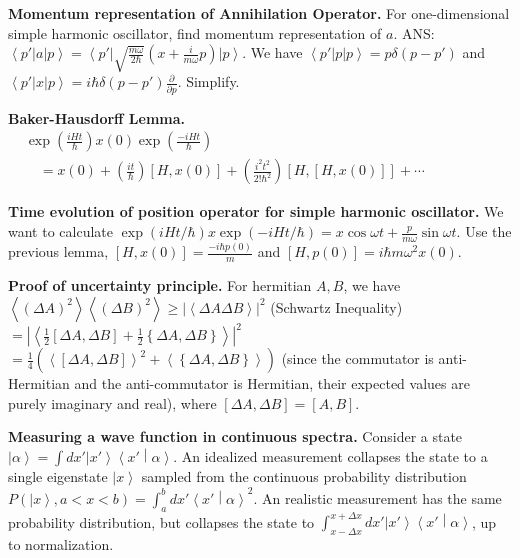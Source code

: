 \textbf{Momentum representation of Annihilation Operator.} For one-dimensional simple harmonic oscillator, find momentum representation of $a$. ANS: $\left\langle p' \right| a \left| p \right\rangle  = \left\langle p' \right| \sqrt{\frac{m \omega}{2 \hbar}} (x + \frac{i}{m \omega} p) \left| p \right\rangle$. We have $\left\langle p' \right| p \left| p \right\rangle  = p \delta(p - p')$ and $\left\langle p' \right| x \left| p \right\rangle = i \hbar \delta(p - p') \frac{\partial }{\partial p} $. Simplify.

\textbf{Baker-Hausdorff Lemma.} $\begin{aligned} & \exp \left(\frac{i H t}{\hbar}\right) x(0) \exp \left(\frac{-i H t}{\hbar}\right) \\ & \quad=x(0)+\left(\frac{i t}{\hbar}\right)[H, x(0)]+\left(\frac{i^2 t^2}{2 ! \hbar^2}\right)[H,[H, x(0)]]+\cdots\end{aligned}$

\textbf{Time evolution of position operator for simple harmonic oscillator.} We want to calculate $\exp(i H t / \hbar) x \exp\left( - i H t /\hbar \right) = x \cos \omega t+\frac{p}{m \omega} \sin \omega t$. Use the previous lemma, $[H, x(0)] = \frac{-i \hbar p(0)}{m}$ and $[H, p(0)] = i \hbar m \omega^2 x(0)$. 


\textbf{Proof of uncertainty principle.} For hermitian $A, B$, we have  $\left\langle (\Delta A)^2 \right\rangle \left\langle (\Delta B)^2 \right\rangle \ge \left| \left\langle \Delta A \Delta B \right\rangle  \right| ^2$ (Schwartz Inequality) 
$= \left| \left\langle \frac{1}{2}[\Delta A, \Delta B] + \frac{1}{2} \left\{ \Delta A, \Delta B \right\}  \right\rangle  \right|^2 $ \\$= \frac{1}{4} \left( \left\langle [\Delta A, \Delta B] \right\rangle ^2 + \left\langle \left\{ \Delta A, \Delta B \right\}  \right\rangle  \right)  $ (since the commutator is anti-Hermitian and the anti-commutator is Hermitian, their expected values are purely imaginary and real), where $[\Delta A, \Delta B] = [A, B]$.

\textbf{Measuring a wave function in continuous spectra. } Consider a state $\left| \alpha \right\rangle  = \int dx' \left| x' \right\rangle \left\langle x' \middle| \alpha \right\rangle $. An idealized measurement collapses the state to a single eigenstate $\left| x \right\rangle $ sampled from the continuous probability distribution $P(\left| x \right\rangle , a < x < b) = \int _a^b dx' \left\langle x' \middle| \alpha \right\rangle ^2 $. An realistic measurement has the same probability distribution, but collapses the state to $\int _{x - \Delta x}^{x + \Delta x} dx' \left| x' \right\rangle \left\langle x' \middle| \alpha \right\rangle $, up to normalization.

